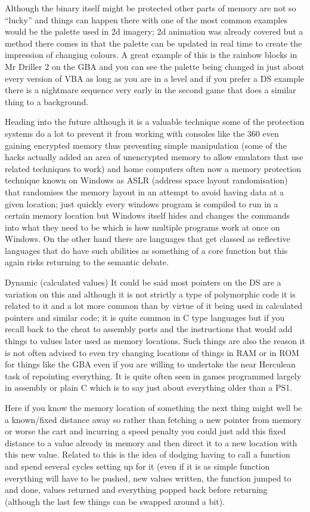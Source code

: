 \documentclass[
]{book}
\begin{document}
Although the binary itself might be protected other parts of memory are not so ``lucky'' and things can happen there with one of the most common examples would be the palette used in 2d imagery; 2d animation was already covered but a method there comes in that the palette can be updated in real time to create the impression of changing colours. A great example of this is the rainbow blocks in Mr Driller 2 on the GBA and you can see the palette being changed in just about every version of VBA as long as you are in a level and if you prefer a DS example there is a nightmare sequence very early in the second game that does a similar thing to a background.

Heading into the future although it is a valuable technique some of the protection systems do a lot to prevent it from working with consoles like the 360 even gaining encrypted memory thus preventing simple manipulation (some of the hacks actually added an area of unencrypted memory to allow emulators that use related techniques to work) and home computers often now a memory protection technique known on Windows as ASLR (address space layout randomisation) that randomises the memory layout in an attempt to avoid having data at a given location; just quickly every windows program is compiled to run in a certain memory location but Windows itself hides and changes the commands into what they need to be which is how multiple programs work at once on Windows. On the other hand there are languages that get classed as reflective languages that do have such abilities as something of a core function but this again risks returning to the semantic debate.

Dynamic (calculated values) It could be said most pointers on the DS are a variation on this and although it is not strictly a type of polymorphic code it is related to it and a lot more common than by virtue of it being used in calculated pointers and similar code; it is quite common in C type languages but if you recall back to the cheat to assembly ports and the instructions that would add things to values later used as memory locations. Such things are also the reason it is not often advised to even try changing locations of things in RAM or in ROM for things like the GBA even if you are willing to undertake the near Herculean task of repointing everything. It is quite often seen in games programmed largely in assembly or plain C which is to say just about everything older than a PS1.

Here if you know the memory location of something the next thing might well be a known/fixed distance away so rather than fetching a new pointer from memory or worse the cart and incurring a speed penalty you could just add this fixed distance to a value already in memory and then direct it to a new location with this new value. Related to this is the idea of dodging having to call a function and spend several cycles setting up for it (even if it is as simple function everything will have to be pushed, new values written, the function jumped to and done, values returned and everything popped back before returning (although the last few things can be swapped around a bit).
\end{document}
